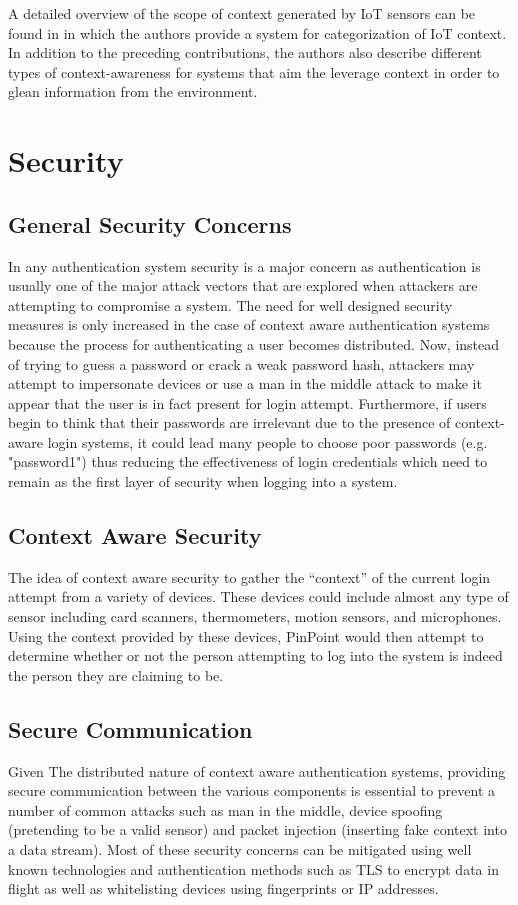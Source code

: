 \documentclass[11pt,journal]{IEEEtran}
\begin{document}
A detailed overview of the scope of context generated by IoT sensors can be found in \citet{Habib:2015} in which the authors provide a system for categorization of IoT context.  In addition to the preceding contributions, the authors also describe different types of context-awareness for systems that aim the leverage context in order to glean information from the environment.


\section{Security}

\subsection{General Security Concerns}
In any authentication system security is a major concern as authentication is usually one of the major attack vectors that are explored when attackers are attempting to compromise a system.  The need for well designed security measures is only increased in the case of context aware authentication systems because the process for authenticating a user becomes distributed.  Now, instead of trying to guess a password or crack a weak password hash, attackers may attempt to impersonate devices or use a man in the middle attack to make it appear that the user is in fact present for login attempt.  Furthermore, if users begin to think that their passwords are irrelevant due to the presence of context-aware login systems, it could lead many people to choose poor passwords (e.g. "password1") thus reducing the effectiveness of login credentials which need to remain as the first layer of security when logging into a system.

\subsection{Context Aware Security}
The idea of context aware security to gather the “context” of the current login attempt from a variety of devices.  These devices could include almost any type of sensor including card scanners, thermometers, motion sensors, and microphones.  Using the context provided by these devices, PinPoint would then attempt to determine whether or not the person attempting to log into the system is indeed the person they are claiming to be.

\subsection{Secure Communication}
Given The distributed nature of context aware authentication systems, providing secure communication between the various components is essential to prevent a number of common attacks such as man in the middle, device spoofing (pretending to be a valid sensor) and packet injection (inserting fake context into a data stream).  Most of these security concerns can be mitigated using well known technologies and authentication methods such as TLS to encrypt data in flight as well as whitelisting devices using fingerprints or IP addresses.
\end{document}
